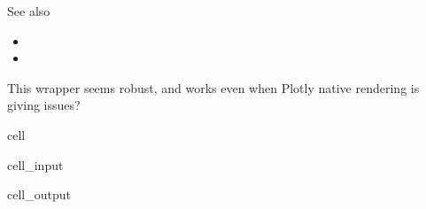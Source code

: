 \documentclass[letterpaper,10pt,english]{jupyterBook}
\begin{document}
\sphinxAtStartPar
See also
\begin{itemize}
\item {} 
\sphinxAtStartPar
{}

\item {} 
\sphinxAtStartPar
{}

\end{itemize}

\sphinxAtStartPar
This wrapper seems robust, and works even when Plotly native rendering is giving issues?

\begin{sphinxuseclass}{cell}\begin{sphinxVerbatimInput}

\begin{sphinxuseclass}{cell_input}
\begin{sphinxVerbatim}[commandchars=\\\{\}]
   
   
\end{sphinxVerbatim}

\end{sphinxuseclass}\end{sphinxVerbatimInput}
\begin{sphinxVerbatimOutput}

\begin{sphinxuseclass}{cell_output}
\end{sphinxuseclass}\end{sphinxVerbatimOutput}

\end{sphinxuseclass}
\end{document}
